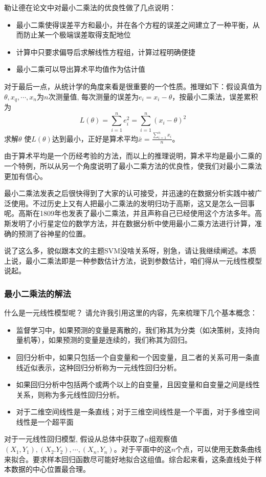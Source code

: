 \documentclass[a4paper,12pt]{article}
\begin{document}
勒让德在论文中对最小二乘法的优良性做了几点说明：
\begin{itemize}
    \item 最小二乘使得误差平方和最小，并在各个方程的误差之间建立了一种平衡，从而防止某一个极端误差取得支配地位
    \item 计算中只要求偏导后求解线性方程组，计算过程明确便捷
    \item 最小二乘可以导出算术平均值作为估计值
\end{itemize}

对于最后一点，从统计学的角度来看是很重要的一个性质。推理如下：假设真值为 $\theta,x_q,\cdots,x_n$为$n$次测量值, 每次测量的误差为$e_i=x_i−\theta$，按最小二乘法，误差累积为
\begin{equation}
  L(\theta)=\sum_{i=1}^ne_i^2=\sum_{i=1}^n(x_i-\theta)^2
\end{equation}
求解$\theta$ 使$L(\theta)$达到最小，正好是算术平均$\bar x=\frac{\sum_{i=1}^nx_i}{n}$。

由于算术平均是一个历经考验的方法，而以上的推理说明，算术平均是最小二乘的一个特例，所以从另一个角度说明了最小二乘方法的优良性，使我们对最小二乘法更加有信心。

最小二乘法发表之后很快得到了大家的认可接受，并迅速的在数据分析实践中被广泛使用。不过历史上又有人把最小二乘法的发明归功于高斯，这又是怎么一回事呢。高斯在1809年也发表了最小二乘法，并且声称自己已经使用这个方法多年。高斯发明了小行星定位的数学方法，并在数据分析中使用最小二乘方法进行计算，准确的预测了谷神星的位置。

说了这么多，貌似跟本文的主题SVM没啥关系呀，别急，请让我继续阐述。本质上说，最小二乘法即是一种参数估计方法，说到参数估计，咱们得从一元线性模型说起。

\subsubsection{最小二乘法的解法}
什么是一元线性模型呢？ 请允许我引用这里的内容，先来梳理下几个基本概念：
\begin{itemize}
    \item 监督学习中，如果预测的变量是离散的，我们称其为分类（如决策树，支持向量机等），如果预测的变量是连续的，我们称其为回归。
    \item 回归分析中，如果只包括一个自变量和一个因变量，且二者的关系可用一条直线近似表示，这种回归分析称为一元线性回归分析。
    \item 如果回归分析中包括两个或两个以上的自变量，且因变量和自变量之间是线性关系，则称为多元线性回归分析。
    \item 对于二维空间线性是一条直线；对于三维空间线性是一个平面，对于多维空间线性是一个超平面
\end{itemize}
对于一元线性回归模型, 假设从总体中获取了$n$组观察值$(X_1,Y_1),(X_2.Y_2),\cdots,(X_n,Y_n)$。对于平面中的这$n$个点，可以使用无数条曲线来拟合。要求样本回归函数尽可能好地拟合这组值。综合起来看，这条直线处于样本数据的中心位置最合理。 
\end{document}

